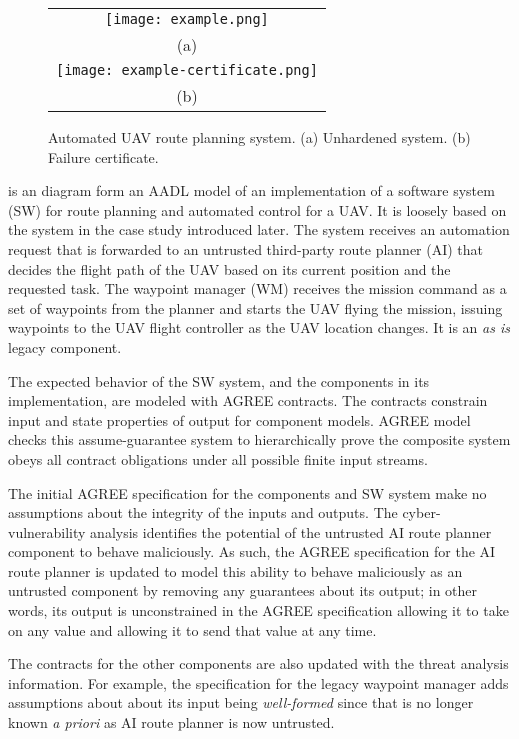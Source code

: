\begin{figure*}
  \begin{center}
    \begin{tabular}{c}
      \texttt{[image: example.png]} \\
      (a) \\
      \texttt{[image: example-certificate.png]} \\
      (b)
    \end{tabular}
  \end{center}
\caption{Automated UAV route planning system. (a) Unhardened system. (b) Failure certificate.}
\label{fig:example}
\end{figure*}

 is an diagram form an AADL model of an implementation of a software system  (SW) for route planning and automated control for a UAV. It is loosely based on the system in the case study introduced later. The system receives an automation request that is forwarded to an untrusted third-party route planner (AI) that decides the flight path of the UAV based on its current position and the requested task. The waypoint manager (WM) receives the mission command as a set of waypoints from the planner and starts the UAV flying the mission, issuing waypoints to the UAV flight controller as the UAV location changes. It is an \emph{as is} legacy component.

The expected behavior of the SW system, and the components in its implementation, are modeled with AGREE contracts. The contracts constrain input and state properties of output for component models. AGREE model checks this assume-guarantee system to hierarchically prove the composite system obeys all contract obligations under all possible finite input streams. 

The initial AGREE specification for the components and SW system make no assumptions about the integrity of the inputs and outputs. The cyber-vulnerability analysis identifies the potential of the untrusted AI route planner component to behave maliciously. As such, the AGREE specification for the AI route planner is updated to model this ability to behave maliciously as an untrusted component by removing any guarantees about its output; in other words, its output is unconstrained in the AGREE specification allowing it to take on any value and allowing it to send that value at any time.

The contracts for the other components are also updated with the threat analysis information. For example, the specification for the legacy waypoint manager adds assumptions about about its input being \emph{well-formed} since that is no longer known \emph{a priori} as AI route planner is now untrusted. 

